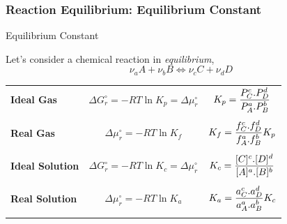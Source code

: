 \documentclass[10pt,compress,handout,unknownkeysallowed]{beamer}
\begin{document}
\begin{frame}
  \frametitle{Reaction Equilibrium: Equilibrium Constant}
       \begin{block}{\begin{center}Equilibrium Constant\end{center}}
            Let's consider a chemical reaction in {\it equilibrium},
               \begin{displaymath}
                   \nu_{a} A + \nu_{b} B \Longleftrightarrow \nu_{c} C + \nu_{d} D 
               \end{displaymath} 
          \begin{center}
            \begin{tabular}{l | c c}
               \hline
                  {\bf Ideal Gas} & $\Delta G_{r}^{\circ}=-RT\ln{K_{p}}=\Delta\mu_{r}^{\circ}$ & $K_{p} = \displaystyle\frac{P_{C}^{c}.P_{D}^{d}}{P_{A}^{a}.P_{B}^{b}}$ \\
                                  &                                                &                                                         \\
                  {\bf Real Gas}  & $\Delta \mu_{r}^{\circ}=-RT\ln{K_{f}}$               &  $K_{f} = \displaystyle\frac{f_{C}^{c}.f_{D}^{d}}{f_{A}^{a}.f_{B}^{b}} K_{p}$ \\
                                  &                                                &                                                         \\
                  {\bf Ideal Solution} & $\Delta G_{r}^{\circ}=-RT\ln{K_{c}}=\Delta\mu_{r}^{\circ}$ & $K_{c} = \displaystyle\frac{[C]^{c}.[D]^{d}}{[A]^{a}.[B]^{b}}$ \\
                                  &                                                &                                                         \\
                  {\bf Real Solution} & $\Delta\mu_{r}^{\circ}=-RT\ln{K_{a}}$             &  $K_{a} = \displaystyle\frac{a_{C}^{c}.a_{D}^{d}}{a_{A}^{a}.a_{B}^{b}} K_{c}$\\
                                  &                                                &                                                         \\
               \hline
            \end{tabular}
           \end{center}
 
       \end{block}
\end{frame}
\end{document}
